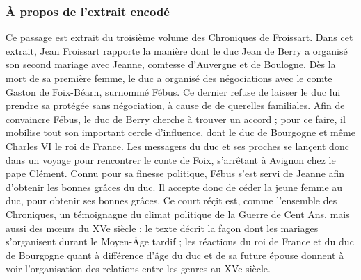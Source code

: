 \documentclass[12pt, a4paper]{article}
\begin{document}
        \subsubsection{À propos de l'extrait encodé}
        Ce passage est extrait du troisième volume des Chroniques de Froissart. Dans cet extrait, Jean Froissart rapporte la manière
                     dont le duc Jean de Berry a organisé son second mariage avec Jeanne, comtesse d’Auvergne et de Boulogne.
                     Dès la mort de sa première femme, le duc a organisé des négociations avec le comte Gaston de Foix-Béarn, surnommé Fébus. Ce dernier refuse de laisser
                     le duc lui prendre sa protégée sans négociation, à cause de de querelles familiales. Afin de convaincre Fébus, le duc de Berry cherche à trouver
                     un accord ; pour ce faire, il mobilise tout son important cercle d'influence, dont le duc de Bourgogne et même Charles VI le roi de France. Les messagers du duc et ses proches se lançent donc dans un voyage pour rencontrer le conte de Foix, s'arrêtant à Avignon chez le pape Clément. Connu pour
                     sa finesse politique, Fébus s'est servi de Jeanne
                     afin d'obtenir les bonnes grâces du duc. Il accepte donc de céder la jeune femme au duc, pour obtenir ses bonnes grâces. Ce court réçit est, comme l'ensemble des Chroniques, un témoignagne du climat politique de la Guerre de Cent Ans, mais aussi des mœurs du XVe siècle : le texte décrit 
                     la façon dont les mariages s'organisent durant le Moyen-Âge tardif ; les réactions du roi de France et du duc de Bourgogne quant à différence d'âge du duc et de sa future
                     épouse donnent à voir l'organisation des relations entre les genres au XVe siècle.
        
\end{document}
